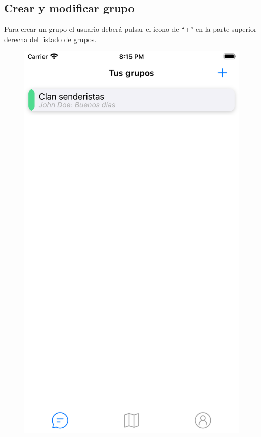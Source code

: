 \begin{appendices}
\section{Crear y modificar grupo}
Para crear un grupo el usuario deberá pulsar el icono de ``+'' en la parte superior derecha del listado de grupos.
\begin{figure}[H]
        \centering
        \begin{minipage}{0.3\textwidth}
            \centering
            \includegraphics[cframe=black 2pt,width=1\linewidth]{images/manual/listadoGruposChats.png}

\end{minipage}
\end{figure}
\end{appendices}
